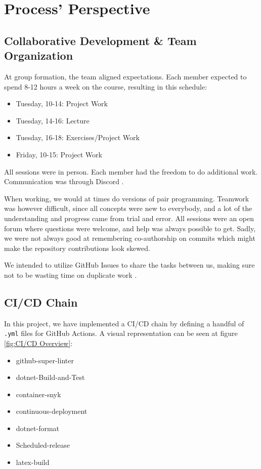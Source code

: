\section{Process' Perspective}

\subsection{Collaborative Development \& Team Organization}

At group formation, the team aligned expectations. Each member expected to spend 8-12 hours a week on the course, resulting in this schedule:

\begin{itemize}
    \item Tuesday, 10-14: Project Work
    \item Tuesday, 14-16: Lecture
    \item Tuesday, 16-18: Exercises/Project Work
    \item Friday, 10-15: Project Work
\end{itemize}

All sessions were in person. Each member had the freedom to do additional work. Communication was through Discord \autocite{discord}.

When working, we would at times do versions of pair programming. Teamwork was however difficult, since all concepts were new to everybody, and a lot of the understanding and progress came from trial and error. All sessions were an open forum where questions were welcome, and help was always possible to get. Sadly, we were not always good at remembering co-authorship on commits which might make the repository contributions look skewed.

We intended to utilize GitHub Issues to share the tasks between us, making sure not to be wasting time on duplicate work \autocite{github-issues}.

\subsection{CI/CD Chain}
In this project, we have implemented a CI/CD chain by defining a handful of \texttt{.yml} files for GitHub Actions. A visual representation can be seen at figure \ref{fig:CI/CD Overview}: 

\begin{itemize}
    \item github-super-linter
    \item dotnet-Build-and-Test
    \item container-snyk
    \item continuous-deployment
    \item dotnet-format
    \item Scheduled-release
    \item latex-build
\end{itemize}

